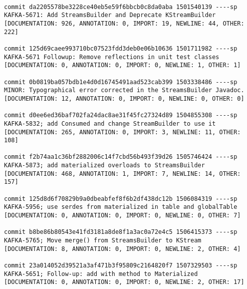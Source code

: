 \begin{mdframed}
\begin{lstlisting}[caption={The \emph{diff metadata}, as produced by the heuristics used in Intelligent History,
    for the commit history of \file{StreamsBuilder.java} from the Apache Kafka repository.
    Ordered from the oldest commit to the most recent commit.}
]

commit da2205578be3228ce40eb5e59f6bbcb0c8da0aba 1501540139 ----sp
KAFKA-5671: Add StreamsBuilder and Deprecate KStreamBuilder                                         
[DOCUMENTATION: 926, ANNOTATION: 0, IMPORT: 19, NEWLINE: 44, OTHER: 222]

commit 125d69caee993710bc07523fdd3deb0e06b10636 1501711982 ----sp
KAFKA-5671 Followup: Remove reflections in unit test classes                                        
[DOCUMENTATION: 0, ANNOTATION: 0, IMPORT: 0, NEWLINE: 1, OTHER: 1]

commit 0b0819ba057bdb1e4d0d16745491aad523cab399 1503338486 ----sp
MINOR: Typographical error corrected in the StreamsBuilder Javadoc.                                 
[DOCUMENTATION: 12, ANNOTATION: 0, IMPORT: 0, NEWLINE: 0, OTHER: 0]

commit d0ee6ed36baf702fa24dac8ae31f45fc27324d89 1504855308 ----sp
KAFKA-5832; add Consumed and change StreamBuilder to use it                                         
[DOCUMENTATION: 265, ANNOTATION: 0, IMPORT: 3, NEWLINE: 11, OTHER: 108]

commit f2b74aa1c36bf2882006c14f7cbd56b493f39d26 1505746424 ----sp
KAFKA-5873; add materialized overloads to StreamsBuilder                                            
[DOCUMENTATION: 468, ANNOTATION: 1, IMPORT: 7, NEWLINE: 14, OTHER: 157]

commit 125d8d6f70829b9a0dbeabfef8f6b2df438dc12b 1506084319 ----sp
KAFKA-5956; use serdes from materialized in table and globalTable                                   
[DOCUMENTATION: 0, ANNOTATION: 0, IMPORT: 0, NEWLINE: 0, OTHER: 7]

commit b8be86b80543e41fd3181a8de8f1a3ac0a72e4c5 1506415373 ----sp
KAFKA-5765; Move merge() from StreamsBuilder to KStream                                             
[DOCUMENTATION: 8, ANNOTATION: 0, IMPORT: 0, NEWLINE: 2, OTHER: 4]

commit 23a014052d39521a3af471b3f95809c2164820f7 1507329503 ----sp
KAFKA-5651; Follow-up: add with method to Materialized                                              
[DOCUMENTATION: 0, ANNOTATION: 0, IMPORT: 0, NEWLINE: 2, OTHER: 17]


\end{lstlisting}
\end{mdframed}
